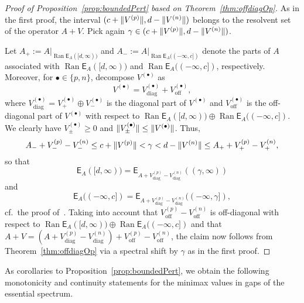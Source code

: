 \documentclass[11pt,a4paper]{amsart}
\numberwithin{equation}{section}
\DeclareMathOperator{\Ran}{Ran}
\DeclarePairedDelimiter{\norm}{\lVert}{\rVert}
\newcommand{\EE}{\mathsf{E}}
\theoremstyle{plain}
\theoremstyle{definition}
\theoremstyle{remark}
\begin{document}
\begin{proof}[Proof of Proposition~\ref{prop:boundedPert} based on Theorem~\ref{thm:offdiagOp}]
  As in the first proof, the interval $(c+\norm{V^{(p)}} , d-\norm{V^{(n)}})$ belongs to the resolvent set of the operator $A+V$.
  Pick again $\gamma \in (c+\norm{V^{(p)}} , d-\norm{V^{(n)}})$.

  Let $A_+ := A|_{\Ran\EE_A([d,\infty))}$ and $A_- := A|_{\Ran\EE_A((-\infty,c])}$ denote the parts of $A$ associated with
  $\Ran \EE_{A}([d,\infty))$ and $\Ran \EE_A((-\infty,c])$, respectively. Moreover, for $\bullet \in \{p,n\}$, decompose
  $V^{(\bullet)}$ as
  \begin{equation*}
    V^{(\bullet)}
    =
    V_{\text{diag}}^{(\bullet)} + V_{\text{off}}^{(\bullet)}
    ,
  \end{equation*}
  where $V_{\text{diag}}^{(\bullet)} = V_+^{(\bullet)} \oplus V_-^{(\bullet)}$ is the diagonal part of $V^{(\bullet)}$ and
  $V_{\text{off}}^{(\bullet)}$ is the off-diagonal part of $V^{(\bullet)}$ with respect to
  $\Ran \EE_A([d,\infty)) \oplus \Ran \EE_A((-\infty,c])$. We clearly have $V_\pm^{(\bullet)} \ge 0$ and
  $\norm{V_\pm^{(\bullet)}} \le \norm{V^{(\bullet)}}$. Thus,
  \begin{equation*}
    A_- + V_-^{(p)} - V_-^{(n)}
    \le
    c + \norm{V^{(p)}}
    <
    \gamma
    <
    d - \norm{V^{(n)}}
    \le
    A_+ + V_+^{(p)} - V_+^{(n)}
    ,
  \end{equation*}
  so that
  \begin{equation*}
    \EE_A([d,\infty))
    =
    \EE_{A + V_{\text{diag}}^{(p)} - V_{\text{diag}}^{(n)}}((\gamma,\infty))
  \end{equation*}
  and
  \begin{equation*}
    \EE_A((-\infty,c])
    =
    \EE_{A + V_{\text{diag}}^{(p)} - V_{\text{diag}}^{(n)}}((-\infty,\gamma])
    ,
  \end{equation*}
  cf.~the proof of~\cite[Proposition~2.1]{Seel19}. Taking into account that $V_\text{off}^{(p)} - V_\text{off}^{(n)}$ is
  off-diagonal with respect to $\Ran \EE_A([d,\infty)) \oplus \Ran \EE_A((-\infty,c])$ and that
  $A+V = (A + V_{\text{diag}}^{(p)} - V_{\text{diag}}^{(n)}) + V_\text{off}^{(p)} - V_\text{off}^{(n)}$, the claim now follows
  from Theorem~\ref{thm:offdiagOp} via a spectral shift by $\gamma$ as in the first proof.
\end{proof}%

As corollaries to Proposition~\ref{prop:boundedPert}, we obtain the following monotonicity and continuity statements for the
minimax values in gaps of the essential spectrum.
\end{document}
